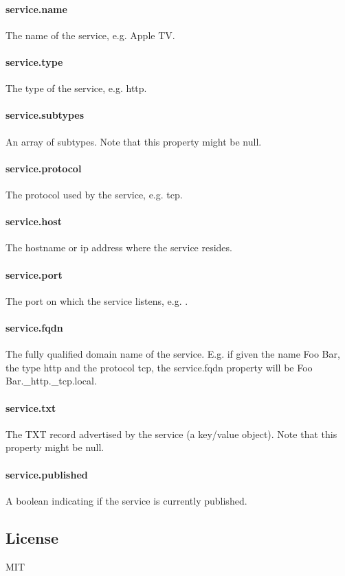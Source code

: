 \paragraph*{{\ttfamily service.\+name}}

The name of the service, e.\+g. {\ttfamily Apple TV}.

\paragraph*{{\ttfamily service.\+type}}

The type of the service, e.\+g. {\ttfamily http}.

\paragraph*{{\ttfamily service.\+subtypes}}

An array of subtypes. Note that this property might be {\ttfamily null}.

\paragraph*{{\ttfamily service.\+protocol}}

The protocol used by the service, e.\+g. {\ttfamily tcp}.

\paragraph*{{\ttfamily service.\+host}}

The hostname or ip address where the service resides.

\paragraph*{{\ttfamily service.\+port}}

The port on which the service listens, e.\+g. {}.

\paragraph*{{\ttfamily service.\+fqdn}}

The fully qualified domain name of the service. E.\+g. if given the name {\ttfamily Foo Bar}, the type {\ttfamily http} and the protocol {\ttfamily tcp}, the {\ttfamily service.\+fqdn} property will be {\ttfamily Foo Bar.\+\_\+http.\+\_\+tcp.\+local}.

\paragraph*{{\ttfamily service.\+txt}}

The T\+XT record advertised by the service (a key/value object). Note that this property might be {\ttfamily null}.

\paragraph*{{\ttfamily service.\+published}}

A boolean indicating if the service is currently published.

\subsection*{License}

M\+IT 